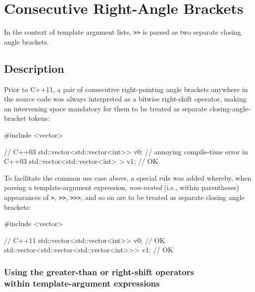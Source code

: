 \newpage
\section[Consecutive {\tt >}s]{Consecutive Right-Angle Brackets}\label{consecutive-right-angle-brackets}

In the context of template argument lists, \lstinline!>>! is parsed as two
separate closing angle brackets.

\subsection[Description]{Description}\label{description}

Prior to C++11, a pair of consecutive right-pointing angle brackets anywhere in
the source code was always interpreted as a bitwise right-shift
operator, making an intervening space mandatory for them to be treated
as separate closing-angle-bracket tokens:

\begin{emcppshiddenlisting}[emcppsbatch=e1]
#include <vector>
\end{emcppshiddenlisting}
\begin{emcppslisting}[emcppsbatch=e1]
// C++03
std::vector<std::vector<int>> v0;   // annoying compile-time error in C++03
std::vector<std::vector<int> > v1;  // OK
\end{emcppslisting}

\noindent To facilitate the common use case above, a special rule was added
whereby, when parsing a template-argument expression, \emph{non-nested}
(i.e., within parentheses) appearances of \lstinline!>!, \lstinline!>>!,
\lstinline!>>>!, and so on are to be treated as separate closing angle brackets:

\begin{emcppshiddenlisting}[emcppsbatch=e2]
#include <vector>
\end{emcppshiddenlisting}
\begin{emcppslisting}[emcppsbatch=e2]
// C++11
std::vector<std::vector<int>> v0;               // OK
std::vector<std::vector<std::vector<int>>> v1;  // OK
\end{emcppslisting}

\subsubsection[Using the greater-than or right-shift operators within template-argument expressions]{Using the greater-than or right-shift operators\\[0.5ex] within template-argument expressions}\label{using-the-greater-than-or-right-shift-operators-within-template-argument-expressions}

